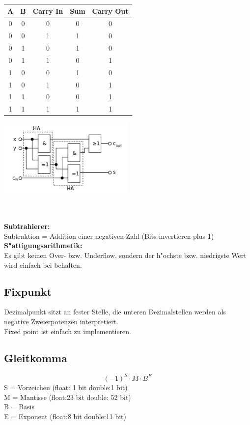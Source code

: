 \begin{minipage}{0.5\textwidth}
	\begin{tabular}{|c | c | c | c | c |}
	\hline
	A & B & Carry In & Sum & Carry Out\\
	\hline
	0 & 0 & 0 & 0 & 0\\
	\hline
	0 & 0 & 1 & 1 & 0\\
	\hline
	0 & 1 & 0 & 1 & 0\\
	\hline
	0 & 1 & 1 & 0 & 1\\
	\hline
	1 & 0 & 0 & 1 & 0\\
	\hline
	1 & 0 & 1 & 0 & 1\\
	\hline
	1 & 1 & 0 & 0 & 1\\
	\hline
	1 & 1 & 1 & 1 & 1\\
	\hline
	\end{tabular}
\end{minipage}
\begin{minipage}{0.9\textwidth}
	\begin{flushleft}
	{\includegraphics[width=0.5\textwidth]{images/Arithmetik/volladdierer.png}}
	\label{Fig: Volladdierer}
	\end{flushleft}
\end{minipage}\\ \\

\textbf{Subtrahierer:}\\
Subtraktion = Addition einer negativen Zahl (Bits invertieren plus 1)\\

\textbf{S"attigungsarithmetik:}\\
Es gibt keinen Over- bzw. Underflow, sondern der h"ochste bzw. niedrigste Wert wird einfach bei behalten.
\subsection{Fixpunkt}
Dezimalpunkt sitzt an fester Stelle, die unteren Dezimalstellen werden als negative Zweierpotenzen interpretiert. \\
Fixed point ist einfach zu implementieren. 
\subsection{Gleitkomma}
\begin{equation}
(-1)^S\cdot M \cdot B^E
\end{equation}
S = Vorzeichen (float: 1 bit double:1 bit)\\
M = Mantisse (float:23 bit double: 52 bit)\\
B = Basis \\
E = Exponent (float:8 bit double:11 bit)\\

